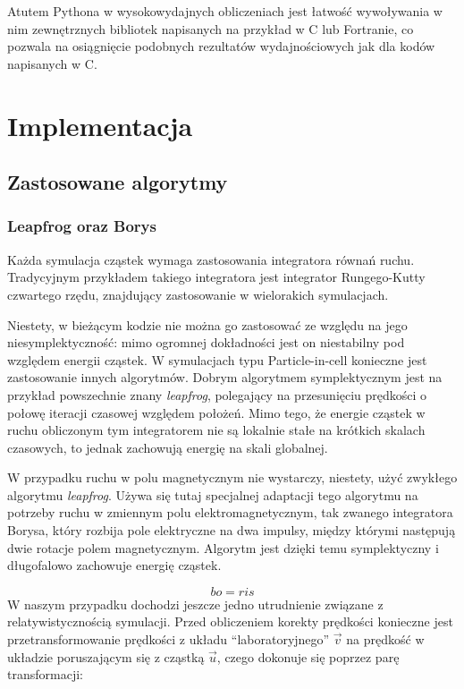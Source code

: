     Atutem Pythona w wysokowydajnych obliczeniach jest łatwość wywoływania w nim zewnętrznych bibliotek napisanych
    na przykład w C lub Fortranie, co pozwala na osiągnięcie podobnych rezultatów wydajnościowych jak dla kodów
    napisanych w C.


\section[Implementacja]{Implementacja}%
    \subsection{Zastosowane algorytmy}
    \subsubsection{Leapfrog oraz Borys}
    Każda symulacja cząstek wymaga zastosowania integratora równań ruchu. Tradycyjnym przykładem takiego
    integratora jest integrator Rungego-Kutty czwartego rzędu, znajdujący zastosowanie w wielorakich
    symulacjach. 

    Niestety, w bieżącym kodzie nie można go zastosować ze względu na jego niesymplektyczność:
    mimo ogromnej dokładności jest on niestabilny pod względem energii cząstek. 
    W symulacjach typu Particle-in-cell konieczne jest zastosowanie innych algorytmów. Dobrym algorytmem
    symplektycznym jest na przykład powszechnie znany \emph{leapfrog}, polegający na
    przesunięciu prędkości o połowę iteracji czasowej względem położeń.
    Mimo tego, że energie cząstek w ruchu obliczonym tym integratorem nie są lokalnie stałe na krótkich skalach
    czasowych, to jednak zachowują energię na skali globalnej.


    W przypadku ruchu w polu magnetycznym nie wystarczy, niestety, użyć zwykłego algorytmu \emph{leapfrog}. 
    Używa się tutaj specjalnej adaptacji tego algorytmu na potrzeby ruchu w zmiennym polu elektromagnetycznym,
    tak zwanego integratora Borysa, 
    który rozbija pole elektryczne na dwa impulsy, między którymi następują dwie 
    rotacje polem magnetycznym. Algorytm jest dzięki temu symplektyczny
    i długofalowo zachowuje energię cząstek.
    
    \begin{equation}
        bo = ris
        \label{eqn:boris-pusher}
    \end{equation}
    W naszym przypadku dochodzi jeszcze jedno utrudnienie związane z relatywistycznością symulacji. 
    Przed obliczeniem korekty prędkości konieczne jest przetransformowanie prędkości z układu ``laboratoryjnego'' $\vec{v}$
    na prędkość w układzie poruszającym się z cząstką $\vec{u}$, czego dokonuje się poprzez parę transformacji:


